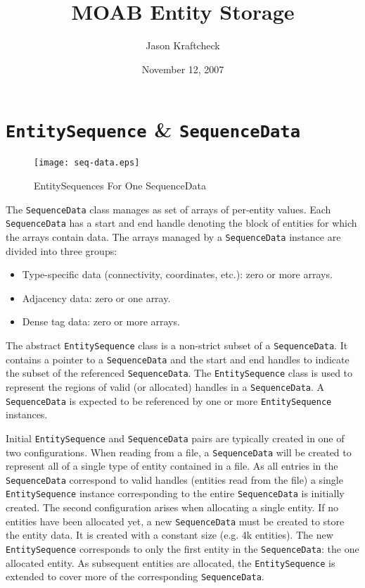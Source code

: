 \documentclass{report}
\title{MOAB Entity Storage}
\author{Jason Kraftcheck}
\date{November 12, 2007}
\begin{document}
\section{\texttt{EntitySequence} \& \texttt{SequenceData}}

\begin{figure*}[htbp]
\begin{center}
\texttt{[image: seq-data.eps]}
\caption{EntitySequences For One SequenceData}
\end{center}
\end{figure*}

The \texttt{SequenceData} class manages as set of arrays of per-entity values.  Each \texttt{SequenceData} has a start and end handle denoting the block of entities for which the arrays contain data.  The arrays managed by a \texttt{SequenceData} instance are divided into three groups:
\begin{itemize}
\item Type-specific data (connectivity, coordinates, etc.): zero or more arrays.
\item Adjacency data: zero or one array.
\item Dense tag data: zero or more arrays.
\end{itemize}

The abstract \texttt{EntitySequence} class is a non-strict subset of a \texttt{SequenceData}.  It contains a pointer to a \texttt{SequenceData}
and the start and end handles to indicate the subset of the referenced \texttt{SequenceData}.  The \texttt{EntitySequence} class is used to represent the regions of valid (or allocated) handles in a \texttt{SequenceData}.  A \texttt{SequenceData} is expected to be referenced by one or more \texttt{EntitySequence} instances.

Initial \texttt{EntitySequence} and \texttt{SequenceData} pairs are typically created in one of two configurations.  When reading from a file, a \texttt{SequenceData} will be created to represent all of a single type of entity contained in a file.  As all entries in the \texttt{SequenceData} correspond to valid handles (entities read from the file) a single \texttt{EntitySequence} instance corresponding to the entire \texttt{SequenceData} is initially created.  The second configuration arises when allocating a single entity.  If no entities have been allocated yet, a new \texttt{SequenceData} must be created to store the entity data.  It is created with a constant size (e.g. 4k entities).  The new \texttt{EntitySequence} corresponds to only the first entity in the \texttt{SequenceData}: the one allocated entity.  As subsequent entities are allocated, the \texttt{EntitySequence} is extended to cover more of the corresponding \texttt{SequenceData}. 
\end{document}
